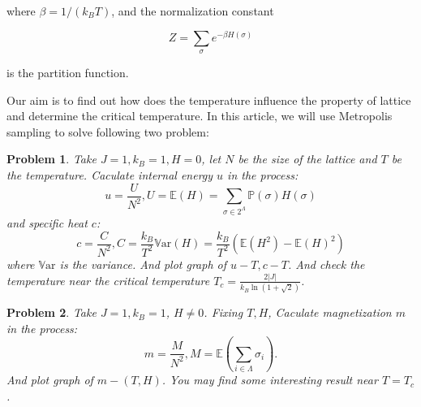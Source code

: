 \documentclass[11pt,openany]{book}              %
\newtheorem{problem}{Problem}
\begin{document}
where \( \beta =1/(k_{B}T)\), and the normalization constant

\[ Z=\sum _{\sigma }e^{-\beta H(\sigma )}\]

is the partition function.

Our aim is to find out how does the temperature influence the property of lattice and determine the critical temperature.
In this article, we will use Metropolis sampling to solve following two problem:

\begin{problem}\label{pro:1}
Take \(J=1, k_B=1, H=0\), let \(N\) be the size of the lattice and \(T\) be the temperature.
Caculate internal energy \(u\) in the process:
\begin{equation}
	u=\frac{U}{N^2},U=\mathbb{E}(H)=\sum_{\sigma\in 2^\Lambda}\mathbb{P}(\sigma)H( \sigma)
\end{equation}
and specific heat \(c\):
\begin{equation}
	c=\frac{C}{N^2}, C=\frac{k_B}{T^2}\mathbb{V}\mathrm{ar}(H)=\frac{k_B}{T^2}( \mathbb{E}( H^2)-\mathbb{E}( H)^2)
\end{equation}
where \(\mathbb{V}\mathrm{ar}\) is the variance.
And plot graph of \(u-T, c-T\).
And check the temperature near the critical temperature \(T_c = \frac{2| J|}{k_B \ln ( 1+\sqrt{2})}\).

\end{problem}
\begin{problem}\label{pro:2}
Take \(J=1, k_B=1\), \(H \neq 0\). Fixing \(T, H\),
Caculate magnetization \(m\) in the process:
\begin{equation}
	m=\frac{M}{N^2}, M=\mathbb{E}(\sum_{i \in \Lambda} \sigma_i ).
\end{equation}
And plot graph of \(m-(T, H)\). You may find some interesting result near \(T = T_c\).

\end{problem}
\end{document}
